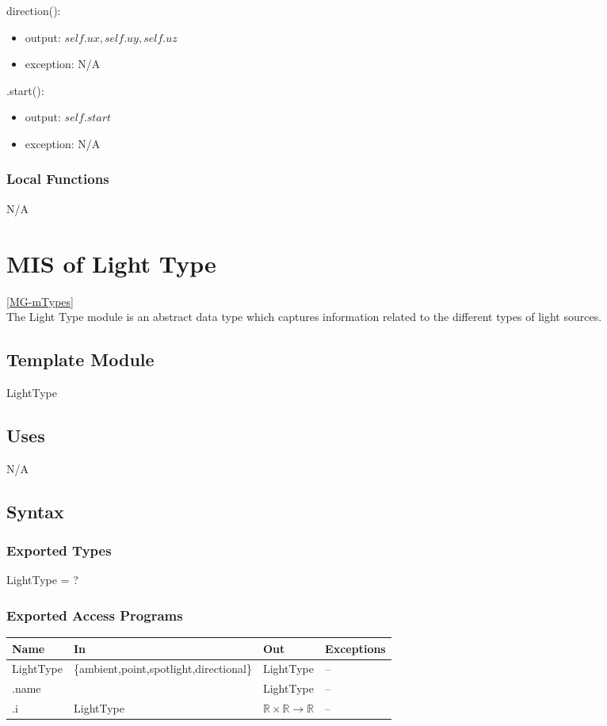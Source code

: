 \documentclass[12pt, titlepage]{article}
\begin{document}
\noindent direction():
\begin{itemize}
	\item output: $self.ux, self.uy, self.uz$
	\item exception: N/A
\end{itemize}

\noindent .start():
\begin{itemize}
	\item output: $self.start$
	\item exception: N/A
\end{itemize}


\subsubsection{Local Functions}
N/A

\newpage

\section{MIS of Light Type} \ref{MG-mTypes} \\
The Light Type module is an abstract data type which captures information 
related to the different types of light sources.

\subsection{Template Module}
LightType

\subsection{Uses}
N/A

\subsection{Syntax}
\subsubsection{Exported Types}
LightType = ?
\subsubsection{Exported Access Programs}
\begin{center}
	\begin{tabular}{p{2cm} p{7cm} p{2cm} p{4cm}}
		\hline
		\textbf{Name} & \textbf{In} & \textbf{Out} & \textbf{Exceptions} \\
		\hline
		LightType & \{ambient,point,spotlight,directional\} & LightType & -- \\
		.name & & LightType & -- \\
		.i & LightType & $\mathbb{R} \times \mathbb{R} \to 
		\mathbb{R}$ & -- \\
		\hline
	\end{tabular}
\end{center}
\end{document}
